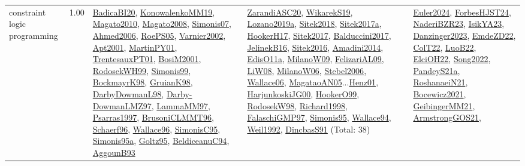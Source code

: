 {\begin{longtable}{p{3cm}r>{\raggedright\arraybackslash}p{6cm}>{\raggedright\arraybackslash}p{6cm}>{\raggedright\arraybackslash}p{8cm}}
\index{constraint logic programming}\index{CP!constraint logic programming}constraint logic programming &  1.00 & \hyperref[detail:BadicaBI20]{BadicaBI20}, \hyperref[detail:KonowalenkoMM19]{KonowalenkoMM19}, \hyperref[detail:Magato2010]{Magato2010}, \hyperref[detail:Magato2008]{Magato2008}, \hyperref[detail:Simonis07]{Simonis07}, \hyperref[detail:Ahmed2006]{Ahmed2006}, \hyperref[detail:RoePS05]{RoePS05}, \hyperref[detail:Varnier2002]{Varnier2002}, \hyperref[detail:Apt2001]{Apt2001}, \hyperref[detail:MartinPY01]{MartinPY01}, \hyperref[detail:TrentesauxPT01]{TrentesauxPT01}, \hyperref[detail:BosiM2001]{BosiM2001}, \hyperref[detail:RodosekWH99]{RodosekWH99}, \hyperref[detail:Simonis99]{Simonis99}, \hyperref[detail:BockmayrK98]{BockmayrK98}, \hyperref[detail:GruianK98]{GruianK98}, \hyperref[detail:DarbyDowmanL98]{DarbyDowmanL98}, \hyperref[detail:Darby-DowmanLMZ97]{Darby-DowmanLMZ97}, \hyperref[detail:LammaMM97]{LammaMM97}, \hyperref[detail:Psarras1997]{Psarras1997}, \hyperref[detail:BrusoniCLMMT96]{BrusoniCLMMT96}, \hyperref[detail:Schaerf96]{Schaerf96}, \hyperref[detail:Wallace96]{Wallace96}, \hyperref[detail:SimonisC95]{SimonisC95}, \hyperref[detail:Simonis95a]{Simonis95a}, \hyperref[detail:Goltz95]{Goltz95}, \hyperref[detail:BeldiceanuC94]{BeldiceanuC94}, \hyperref[detail:AggounB93]{AggounB93} & \hyperref[detail:ZarandiASC20]{ZarandiASC20}, \hyperref[detail:WikarekS19]{WikarekS19}, \hyperref[detail:Lozano2019a]{Lozano2019a}, \hyperref[detail:Sitek2018]{Sitek2018}, \hyperref[detail:Sitek2017a]{Sitek2017a}, \hyperref[detail:HookerH17]{HookerH17}, \hyperref[detail:Sitek2017]{Sitek2017}, \hyperref[detail:Balduccini2017]{Balduccini2017}, \hyperref[detail:JelinekB16]{JelinekB16}, \hyperref[detail:Sitek2016]{Sitek2016}, \hyperref[detail:Amadini2014]{Amadini2014}, \hyperref[detail:EdisO11a]{EdisO11a}, \hyperref[detail:MilanoW09]{MilanoW09}, \hyperref[detail:FelizariAL09]{FelizariAL09}, \hyperref[detail:LiW08]{LiW08}, \hyperref[detail:MilanoW06]{MilanoW06}, \hyperref[detail:Stebel2006]{Stebel2006}, \hyperref[detail:Wallace06]{Wallace06}, \hyperref[detail:MagataoAN05]{MagataoAN05}...\hyperref[detail:Henz01]{Henz01}, \hyperref[detail:HarjunkoskiJG00]{HarjunkoskiJG00}, \hyperref[detail:HookerO99]{HookerO99}, \hyperref[detail:RodosekW98]{RodosekW98}, \hyperref[detail:Richard1998]{Richard1998}, \hyperref[detail:FalaschiGMP97]{FalaschiGMP97}, \hyperref[detail:Simonis95]{Simonis95}, \hyperref[detail:Wallace94]{Wallace94}, \hyperref[detail:Weil1992]{Weil1992}, \hyperref[detail:DincbasS91]{DincbasS91} (Total: 38) & \hyperref[detail:Euler2024]{Euler2024}, \hyperref[detail:ForbesHJST24]{ForbesHJST24}, \hyperref[detail:NaderiBZR23]{NaderiBZR23}, \hyperref[detail:IsikYA23]{IsikYA23}, \hyperref[detail:Danzinger2023]{Danzinger2023}, \hyperref[detail:EmdeZD22]{EmdeZD22}, \hyperref[detail:ColT22]{ColT22}, \hyperref[detail:LuoB22]{LuoB22}, \hyperref[detail:ElciOH22]{ElciOH22}, \hyperref[detail:Song2022]{Song2022}, \hyperref[detail:PandeyS21a]{PandeyS21a}, \hyperref[detail:RoshanaeiN21]{RoshanaeiN21}, \hyperref[detail:Bocewicz2021]{Bocewicz2021}, \hyperref[detail:GeibingerMM21]{GeibingerMM21}, \hyperref[detail:ArmstrongGOS21]{ArmstrongGOS21}, 
\end{longtable}}
